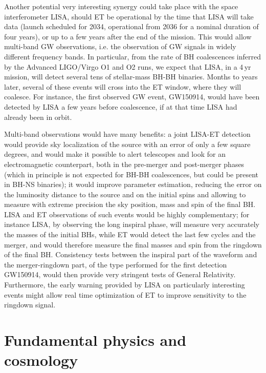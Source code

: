 Another potential very interesting synergy could take place with the space interferometer LISA, should ET be operational  by the time that LISA will take data (launch scheduled for 2034, operational from 2036 for a nominal duration of four years), or up to a few years  after the end of the mission. This would allow multi-band GW observations, i.e. the observation of GW signals in widely different frequency bands. In particular, from the rate of BH coalescences inferred by the Advanced LIGO/Virgo O1 and O2 runs, 
we expect that LISA, in a 4\,yr mission, will detect several tens of stellar-mass BH-BH binaries.
Months to years later, several of these events will cross into the ET window, where they will coalesce. For instance, the first observed GW event, GW150914,  
would have been detected by LISA a few years before coalescence,
if  at that time LISA had already been  in orbit.


Multi-band observations would have many benefits: a joint LISA-ET detection would provide
sky localization of the source with an error of only a few square degrees, and 
would make it possible to alert telescopes and look for an electromagnetic counterpart, both  in the pre-merger and post-merger phases (which in principle is not expected for BH-BH coalescences, but could be present in BH-NS binaries); it
would improve parameter estimation, reducing the error on the luminosity distance to the source and on the initial spins  and  allowing to measure with extreme precision the sky position, mass and spin of the final BH. LISA and ET observations of such events would be highly complementary; for instance LISA, by observing the long inspiral phase, will measure very accurately the masses of the initial BHs, while ET  would detect  the last few cycles and the merger, and would therefore measure the final masses and spin from the ringdown of the final BH. Consistency tests  between the
inspiral part of the waveform and the merger-ringdown part, of the type performed 
for the first detection GW150914, would then provide very stringent tests of General Relativity.
Furthermore, the early warning provided by LISA on particularly interesting events might allow real time optimization of ET  to improve sensitivity to the ringdown signal.

\section{Fundamental physics and cosmology}

